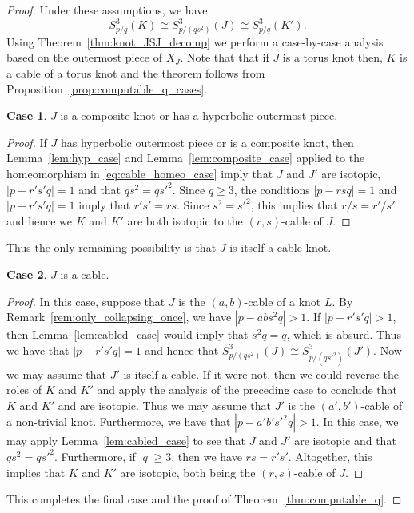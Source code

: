 \documentclass{amsart} %
\theoremstyle{thm}
\theoremstyle{definition}
\newtheorem{case}{Case}
\numberwithin{equation}{section}
\begin{document}
\begin{proof}
Under these assumptions, we have
\begin{equation}\label{eq:cable_homeo_case}
    S^3_{p/q}(K)\cong S^3_{p/(qs^2)}(J)\cong S^3_{p/q}(K').
\end{equation}
Using Theorem~\ref{thm:knot_JSJ_decomp} we perform a case-by-case analysis based on the outermost piece of $X_J$. Note that that if $J$ is a torus knot then, $K$ is a cable of a torus knot and the theorem follows from Proposition~\ref{prop:computable_q_cases}.
\begin{case}
$J$ is a composite knot or has a hyperbolic outermost piece.
\end{case}
\begin{proof}
    If $J$ has hyperbolic outermost piece or is a composite knot, then Lemma~\ref{lem:hyp_case} and Lemma~\ref{lem:composite_case} applied to the homeomorphism in \eqref{eq:cable_homeo_case} imply that $J$ and $J'$ are isotopic,  $|p-r's'q|=1$ and that $qs^2=qs'^2$. Since $q\geq 3$, the conditions $|p-rsq|=1$ and  $|p-r's'q|=1$ imply that $r's'=rs$. Since $s^2=s'^2$, this implies that $r/s=r'/s'$ and hence we $K$ and $K'$ are both isotopic to the $(r,s)$-cable of $J$.
\end{proof}

Thus the only remaining possibility is that $J$ is itself a cable knot.

\begin{case}
$J$ is a cable.
\end{case}
\begin{proof}
In this case, suppose that $J$ is the $(a,b)$-cable of a knot $L$. By Remark~\ref{rem:only_collapsing_once}, we have $|p-abs^2q|>1$. If $|p-r's'q|>1$, then Lemma~\ref{lem:cabled_case} would imply that $s^2q=q$, which is absurd. Thus we have that $|p-r's'q|=1$ and hence that $S_{p/(qs^2)}^3(J)\cong S_{p/(qs'^2)}^3(J')$. Now we may assume that $J'$ is itself a cable. If it were not, then we could reverse the roles of $K$ and $K'$ and apply the analysis of the preceding case to conclude that $K$ and $K'$ and are isotopic. Thus we may assume that $J'$ is the $(a',b')$-cable of a non-trivial knot. Furthermore, we have that $|p-a'b's'^2q|>1$. In this case, we may apply Lemma~\ref{lem:cabled_case} to see that $J$ and $J'$ are isotopic and that $qs^2=qs'^2$. Furthermore, if $|q|\geq 3$, then we have $rs=r's'$. Altogether, this implies that $K$ and $K'$ are isotopic, both being the $(r,s)$-cable of $J$. 
\end{proof}
This completes the final case and the proof of Theorem~\ref{thm:computable_q}.
\end{proof}
\end{document}
